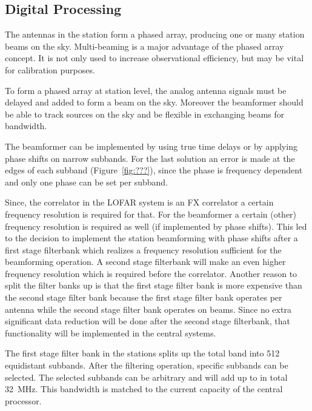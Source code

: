 \documentclass[journal]{IEEEtran}
\begin{document}

\subsection{Digital Processing}

The antennas in the station form a phased array, producing one or many station beams on the sky. Multi-beaming is a major advantage of the phased array concept. It is not only used to increase observational efficiency, but may be vital for calibration purposes. 

To form a phased array at station level, the analog antenna signals must be delayed and added to form a beam on the sky. Moreover the beamformer should be able to track sources on the sky and be flexible in exchanging beams for bandwidth. 

The beamformer can be implemented by using true time delays or by applying phase shifts on narrow subbands. For the last solution an error is made at the edges of each subband (Figure~\ref{fig:???}), since the phase is frequency dependent and only one phase can be set per subband. 


Since, the correlator in the LOFAR system is an FX correlator a certain frequency resolution is required for that. For the beamformer a certain (other) frequency resolution is required as well (if implemented by phase shifts). This led to the decision to implement the station beamforming with phase shifts after a first stage filterbank which realizes a frequency resolution sufficient for the beamforming operation. A second stage filterbank will make an even higher frequency resolution which is required before the correlator. Another reason to split the filter banks up is that the first stage filter bank is more expensive than the second stage filter bank because the first stage filter bank operates per antenna while the second stage filter bank operates on beams. Since no extra significant data reduction will be done after the second stage filterbank, that functionality will be implemented in the central systems.

The first stage filter bank in the stations splits up the total band into 512 equidistant subbands. After the filtering operation, specific subbands can be selected. The selected subbands can be arbitrary and will add up to in total 32~MHz. This bandwidth is matched to the current capacity of the central processor.
\end{document}
